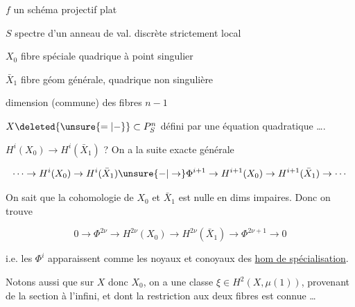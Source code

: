 

$f$ un schéma projectif plat

$S$ spectre d'un anneau de val. discrète strictement local

$X_0$ fibre spéciale quadrique à point singulier

$\bar X_1$ fibre géom générale, quadrique non singulière

dimension (commune) des fibres $n-1$

\unsure{$\mathrm{I}$|$[$}


$X\deleted{\unsure{=|{-}}}\subset P^n_S$ défini par une équation quadratique \ldots.

$H^i(X_0)\to H^i(\bar X_1)$ ? On a la suite exacte générale

\[
\cdots\to H^i(X_0)\to H^i(\bar X_1)\unsure{\mathord{-}|\to}\Phi^{i+1}\to H^{i+1}(X_0)\to H^{i+1}(\bar X_1)\to\cdots
\]


On sait que la cohomologie de  $X_0$ et $\bar X_1$ est nulle en dims impaires. Donc on trouve

\[
0\to\Phi^{2\nu}\to H^{2\nu}(X_0)\to H^{2\nu}(\bar X_1)\to\Phi^{2\nu+1}\to0
\]

i.e. les $\Phi^{i}$ apparaissent  comme les noyaux et conoyaux des \uline{hom de spécialisation}.

Notons aussi que sur $X$ donc $X_0$, on a une classe $\xi\in H^2(X,\mu(1))$, provenant de la section à l'infini, et dont la restriction aux deux fibres est connue \ldots

